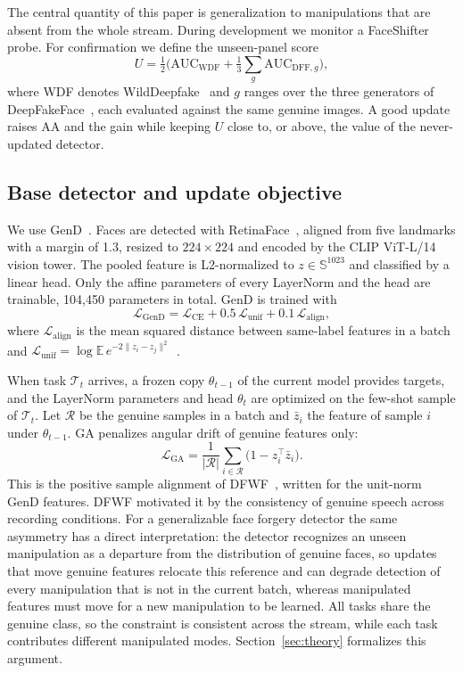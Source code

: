 \documentclass[journal]{IEEEtran}
\begin{document}
The central quantity of this paper is generalization to manipulations that are absent from the whole stream. During development we monitor a FaceShifter~\cite{li2020faceshifter} probe. For confirmation we define the unseen-panel score
\begin{equation}
U=\tfrac{1}{2}\Big(\mathrm{AUC}_{\mathrm{WDF}}+\tfrac{1}{3}\sum_{g}\mathrm{AUC}_{\mathrm{DFF},g}\Big),
\end{equation}
where WDF denotes WildDeepfake~\cite{zi2020wilddeepfake} and $g$ ranges over the three generators of DeepFakeFace~\cite{song2023deepfakeface}, each evaluated against the same genuine images. A good update raises AA and the gain while keeping $U$ close to, or above, the value of the never-updated detector.

\subsection{Base detector and update objective}
We use GenD~\cite{yermakov2026gend}. Faces are detected with RetinaFace~\cite{deng2020retinaface}, aligned from five landmarks with a margin of 1.3, resized to $224\times224$ and encoded by the CLIP ViT-L/14 vision tower. The pooled feature is L2-normalized to $z\in\mathbb{S}^{1023}$ and classified by a linear head. Only the affine parameters of every LayerNorm and the head are trainable, 104{,}450 parameters in total. GenD is trained with
\begin{equation}
\mathcal{L}_{\mathrm{GenD}}=\mathcal{L}_{\mathrm{CE}}+0.5\,\mathcal{L}_{\mathrm{unif}}+0.1\,\mathcal{L}_{\mathrm{align}},
\end{equation}
where $\mathcal{L}_{\mathrm{align}}$ is the mean squared distance between same-label features in a batch and $\mathcal{L}_{\mathrm{unif}}=\log\mathbb{E}\,e^{-2\|z_i-z_j\|^2}$~\cite{wang2020alignuniform}.

When task $\mathcal{T}_t$ arrives, a frozen copy $\theta_{t-1}$ of the current model provides targets, and the LayerNorm parameters and head $\theta_t$ are optimized on the few-shot sample of $\mathcal{T}_t$. Let $\mathcal{R}$ be the genuine samples in a batch and $\bar z_i$ the feature of sample $i$ under $\theta_{t-1}$. GA penalizes angular drift of genuine features only:
\begin{equation}
\mathcal{L}_{\mathrm{GA}}=\frac{1}{|\mathcal{R}|}\sum_{i\in\mathcal{R}}\big(1-z_i^{\top}\bar z_i\big).
\end{equation}
This is the positive sample alignment of DFWF~\cite{ma2021dfwf}, written for the unit-norm GenD features. DFWF motivated it by the consistency of genuine speech across recording conditions. For a generalizable face forgery detector the same asymmetry has a direct interpretation: the detector recognizes an unseen manipulation as a departure from the distribution of genuine faces, so updates that move genuine features relocate this reference and can degrade detection of every manipulation that is not in the current batch, whereas manipulated features must move for a new manipulation to be learned. All tasks share the genuine class, so the constraint is consistent across the stream, while each task contributes different manipulated modes. Section~\ref{sec:theory} formalizes this argument.
\end{document}
